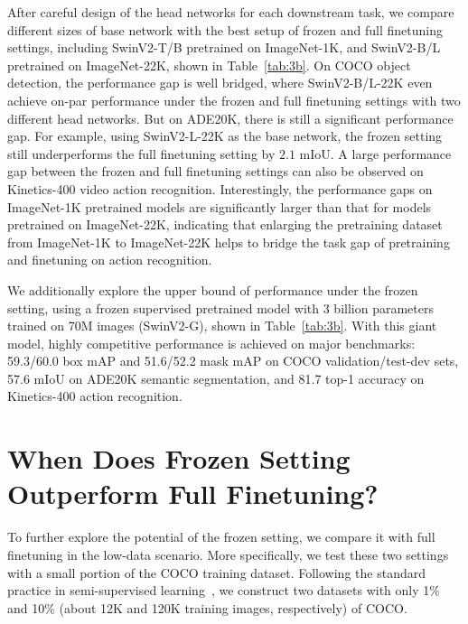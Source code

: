 \documentclass{article}
\begin{document}
After careful design of the head networks for each downstream task, we compare different sizes of base network with the best setup of frozen and full finetuning settings, including SwinV2-T/B pretrained on ImageNet-1K, and SwinV2-B/L pretrained on ImageNet-22K, shown in Table~\ref{tab:3b}. On COCO object detection, the performance gap is well bridged, where SwinV2-B/L-22K even achieve on-par performance under the frozen and full finetuning settings with two different head networks. But on ADE20K, there is still a significant performance gap. For example, using SwinV2-L-22K as the base network, the frozen setting still underperforms the full finetuning setting by $2.1$ mIoU. A large performance gap between the frozen and full finetuning settings can also be observed on Kinetics-400 video action recognition. Interestingly, the performance gaps on ImageNet-1K pretrained models are significantly larger than that for models pretrained on ImageNet-22K, indicating that enlarging the pretraining dataset from ImageNet-1K to ImageNet-22K helps to bridge the task gap of pretraining and finetuning on action recognition.

We additionally explore the upper bound of performance under the frozen setting, using a frozen supervised pretrained model with 3 billion parameters trained on 70M images (SwinV2-G), shown in Table~\ref{tab:3b}. With this giant model, highly competitive performance is achieved on major benchmarks: 59.3/60.0 box mAP and 51.6/52.2 mask mAP on COCO validation/test-dev sets, 57.6 mIoU on ADE20K semantic segmentation, and 81.7 top-1 accuracy on Kinetics-400 action recognition. 

\section{When Does Frozen Setting Outperform Full Finetuning?}

To further explore the potential of the frozen setting, we compare it with full finetuning in the low-data scenario. More specifically, we test these two settings with a small portion of the COCO training dataset. Following the standard practice in semi-supervised learning~\cite{sohn2020simple_semi, xu2021softteacher}, we construct two datasets with only 1\% and 10\% (about 12K and 120K training images, respectively) of COCO. 
\end{document}
